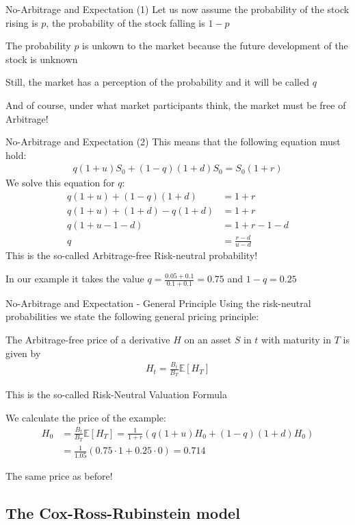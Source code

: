 No-Arbitrage and Expectation (1)
	Let us now assume the probability of the stock rising is $p$, the probability of the stock falling is $1-p$
  
	The probability $p$ is unkown to the market because the future development of the stock is unknown
 
  Still, the market has a perception of the probability and it will  be called $q$
  
	And of course, under what market participants think, the market must be free of Arbitrage!


No-Arbitrage and Expectation (2)
	This means that the following equation must hold:
		\begin{align*}
			q (1+u) S_0 + (1-q) (1+d) S_0 = S_0 (1+r)
		\end{align*}
	We solve this equation for $q$:
		\begin{align*}
			q (1+u) + (1-q) (1+d) & = 1+r \\
			q (1+u) + (1+d) -q (1+d) & = 1+r \\
			q (1+u - 1 -d) & = 1+r -1 - d\\
			q & = \frac{r-d}{u-d}
		\end{align*}
  This is the so-called Arbitrage-free Risk-neutral probability!
  
	In our example it takes the value $q = \frac{0.05 + 0.1}{0.1 + 0.1} = 0.75$ and $1-q=0.25$


No-Arbitrage and Expectation - General Principle
	Using the risk-neutral probabilities we state the following general pricing principle:
  
	The Arbitrage-free price of a derivative $H$ on an asset $S$ in $t$ with maturity in $T$ is given by
		\begin{align*}
			H_t = \frac{B_t}{B_T} \mathbb{E}[H_T]
		\end{align*}
	
	This is the so-called Risk-Neutral Valuation Formula
  
  We calculate the price of the example:
		\begin{align*}
			H_0 & = \frac{B_t}{B_T} \mathbb{E}[H_T] = \frac{1}{1+r} (q (1+u) H_0 + (1-q) (1+d) H_0) \\
			& = \frac{1}{1.05} (0.75 \cdot 1 + 0.25 \cdot 0) = 0.714
		\end{align*}
	
	The same price as before!


\subsection{The Cox-Ross-Rubinstein model}

